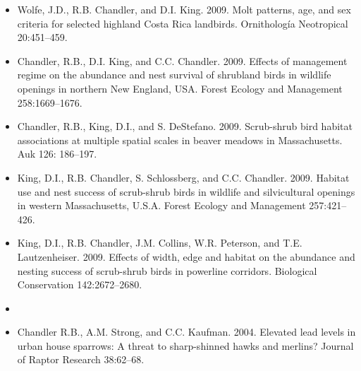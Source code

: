 \begin{itemize}
\item Wolfe, J.D., R.B. Chandler, and D.I. King. 2009. Molt
  patterns, age, and sex criteria for selected highland Costa Rica
  landbirds. Ornitholog\'{i}a Neotropical 20:451--459.

\item Chandler, R.B., D.I. King, and C.C. Chandler. 2009. Effects
  of management regime on the abundance and nest survival of shrubland
  birds in wildlife openings in northern New England, USA. Forest
  Ecology and Management 258:1669--1676.

\item Chandler, R.B., King, D.I., and
  S. DeStefano. 2009. Scrub-shrub bird habitat associations at
  multiple spatial scales in beaver meadows in Massachusetts. Auk 126:
  186--197.

\item King, D.I., R.B. Chandler, S. Schlossberg, and
  C.C. Chandler. 2009. Habitat use and nest success of scrub-shrub
  birds in wildlife and silvicultural openings in western
  Massachusetts, U.S.A. Forest Ecology and Management 257:421--426.

\item King, D.I., R.B. Chandler, J.M. Collins, W.R. Peterson, and
  T.E. Lautzenheiser. 2009. Effects of width, edge and habitat on the
  abundance and nesting success of scrub-shrub birds in powerline
  corridors. Biological Conservation 142:2672--2680.

\item[] { \\}

\item Chandler R.B., A.M. Strong, and C.C. Kaufman. 2004. Elevated
  lead levels in urban house sparrows: A threat to sharp-shinned hawks
  and merlins? Journal of Raptor Research 38:62--68.

\end{itemize}








\begin{comment}
\emph{Technical Reports}
\begin{itemize}
  \item Chandler, R.B., D.I. King, and C.C. Chandler. 2006. Butterfly
    occurrence and species richness in wildlife openings and clearcuts
    on the White Mountain National Forest. A Report to the Wildlife TES
    Program, White Mountain National Forest.
\end{itemize}
\end{comment}

